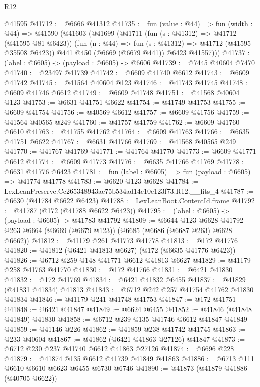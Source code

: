 \begin{lexlean}{R12}
\begin{coremodule}
    @41595
@41712 := @6666 @41312
@41735 := fun (value : @44) =>
  fun (width : @44) =>
  @41590
    (@41603
      (@41699
        (@41711
          (fun (s : @41312) => @41712 (@41595 @81 @6423))
          (fun (n : @44) => fun (s : @41312) => @41712 (@41595 @35508 @6423))
          @441
          @450
          (@6669 (@6679 @441))
          @6423
          @41557)))
@41737 := (label : @6605) -> (payload : @6605) -> @6606
@41739 := @7445 @40604 @7470
@41740 := @23497 @41739
@41742 := @6609 @41740 @6612
@41743 := @6609 @41742
@41745 := @41564 @40604 @123
@41746 := @41743 @41745
@41748 := @6609 @41746 @6612
@41749 := @6609 @41748
@41751 := @41568 @40604 @123
@41753 := @6631 @41751 @6622
@41754 := @41749 @41753
@41755 := @6609 @41754
@41756 := @40569 @6612
@41757 := @6609 @41756
@41759 := @41564 @40565 @249
@41760 := @41757 @41759
@41762 := @6609 @41760 @6610
@41763 := @41755 @41762
@41764 := @6609 @41763
@41766 := @6635 @41751 @6622
@41767 := @6631 @41766
@41769 := @41568 @40565 @249
@41770 := @41767 @41769
@41771 := @41764 @41770
@41773 := @6609 @41771 @6612
@41774 := @6609 @41773
@41776 := @6635 @41766 @41769
@41778 := @6631 @41776 @6423
@41781 := fun (label : @6605) => fun (payload : @6605) => @41774 @41778
@41783 := @6620 @123 @6628
@41784 := LexLeanPreserve.Cc265348943ac75b534ad14c10e123f73.R12.__fits_4
@41787 := @6630 (@41784 @6622 @6423)
@41788 := LexLeanBoot.ContentId.frame
@41792 := @41787 (@172 (@41788 @6622 @6423))
@41795 := (label : @6605) -> (payload : @6605) -> @41783 @41792
@41809 := @6644
    @123
    @6628
    @41792
    @263
    @6664
    (@6669 (@6679 @123))
    (@6685 (@6686 (@6687 @263) @6628 @6662))
@41812 := @41179 @261 @41773 @41778
@41813 := @172 @41776
@41820 := @41812 (@6421 @41813 @6627) (@172 (@6635 @41776 @6423))
@41826 := @6712 @259 @148 @41771 @6612 @41813 @6627
@41829 := @41179 @258 @41763 @41770
@41830 := @172 @41766
@41831 := @6421 @41830
@41832 := @172 @41769
@41834 := @6421 @41832 @6455
@41837 := @41829 (@41831 @41834) @41813
@41843 := @6712 @242 @257 @41754 @41762 @41830 @41834
@41846 := @41179 @241 @41748 @41753
@41847 := @172 @41751
@41848 := @6421 @41847
@41849 := @6624 @6455
@41852 := @41846 (@41848 @41849) @41830
@41858 := @6712 @239 @135 @41746 @6612 @41847 @41849
@41859 := @41146 @226
@41862 := @41859 @238 @41742 @41745
@41863 := @233 @40604
@41867 := @41862 (@6421 @41863 @27126) @41847
@41873 := @6712 @230 @237 @41740 @6612 @41863 @27126
@41874 := @6696 @228
@41879 := @41874 @135 @6612 @41739 @41849 @41863
@41886 := @6713 @111 @6610 @6610 @6623 @6455 @6730 @6746
@41890 := @41873 (@41879 @41886 (@40705 @6622))

\end{coremodule}
\end{lexlean}
